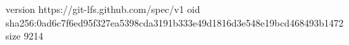 version https://git-lfs.github.com/spec/v1
oid sha256:0ad6c7f6ed95f327ea5398cda3191b333e49d1816d3e548e19bcd468493b1472
size 9214
